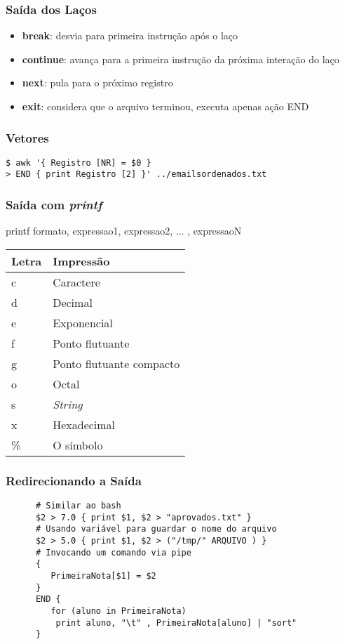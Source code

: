 \documentclass{beamer}
\begin{document}
   \begin{frame}
      \frametitle{Saída dos Laços}
      \begin{itemize}
         \item \textbf{break}: desvia para primeira instrução após o laço
	 \item \textbf{continue}: avança para a primeira instrução da próxima interação do laço
	 \item \textbf{next}: pula para o próximo registro
	 \item \textbf{exit}: considera que o arquivo terminou, executa apenas ação END
      \end{itemize}
   \end{frame}

   \begin{frame}[fragile]
      \frametitle{Vetores}
      \begin{verbatim}
$ awk '{ Registro [NR] = $0 } 
> END { print Registro [2] }' ../emailsordenados.txt 
      \end{verbatim}
\end{frame}

   \begin{frame}
      \frametitle{Saída com \textit{printf}}
      printf formato, expressao1, expressao2, ... , expressaoN \\
      \begin{table}
         \begin{tabular}{l|l}
	 Letra & Impressão \\
	 \hline
         c & Caractere \\
         d & Decimal \\
         e & Exponencial \\
         f & Ponto flutuante \\
         g & Ponto flutuante compacto \\
         o & Octal \\
         s & \textit{String} \\
         x & Hexadecimal \\
         \% & O símbolo \\
         \end{tabular}
      \end{table}
   \end{frame}

   \begin{frame}[fragile]
      \frametitle{Redirecionando a Saída}
      \footnotesize
      \begin{verbatim}
      # Similar ao bash
      $2 > 7.0 { print $1, $2 > "aprovados.txt" }
      # Usando variável para guardar o nome do arquivo
      $2 > 5.0 { print $1, $2 > ("/tmp/" ARQUIVO ) }
      # Invocando um comando via pipe
      {
         PrimeiraNota[$1] = $2
      }
      END {
         for (aluno in PrimeiraNota) 
	      print aluno, "\t" , PrimeiraNota[aluno] | "sort" 
      }

      \end{verbatim}
\end{frame}
\end{document}
